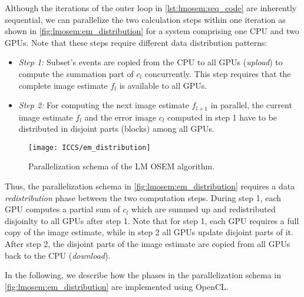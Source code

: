 Although the iterations of the outer loop in \autoref{lst:lmosem:seq_code} are inherently sequential, we can parallelize the two calculation steps within one iteration as shown in \autoref{fig:lmosem:em_distribution} for a system comprising one CPU and two GPUs.
Note that these steps require different data distribution patterns:
\begin{itemize}
  \item[] \emph{Step 1:} Subset's events are copied from the CPU to all GPUs (\emph{upload}) to compute the summation part of $c_l$ concurrently. This step requires that the complete image estimate $f_l$ is available to all GPUs.
  \item[] \emph{Step 2:} For computing the next image estimate $f_{l+1}$ in parallel, the current image estimate $f_l$ and the error image $c_l$ computed in step 1 have to be distributed in disjoint parts (blocks) among all GPUs.
\end{itemize}

\begin{figure}
  \centering
  \texttt{[image: ICCS/em\_distribution]}
  \caption{Parallelization schema of the LM OSEM algorithm.}
  \label{fig:lmosem:em_distribution}
\end{figure}
Thus, the parallelization schema in \autoref{fig:lmosem:em_distribution} requires a data \emph{redistribution} phase between the two computation steps.
During step 1, each GPU computes a partial sum of $c_l$ which are summed up and redistributed disjoinlty to all GPUs after step 1.
Note that for step 1, each GPU requires a full copy of the image estimate, while in step 2 all GPUs update disjoint parts of it.
After step 2, the disjoint parts of the image estimate are copied from all GPUs back to the CPU (\emph{download}).

\bigskip\noindent
In the following, we describe how the phases in the parallelization schema in \autoref{fig:lmosem:em_distribution} are implemented using OpenCL.

